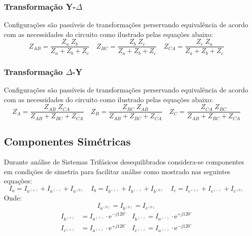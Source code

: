 \documentclass{article}
\begin{document}
\subsubsection{Transformação Y-$\Delta$}
\begin{definition}
    Configurações são passíveis de transformações perservando equivalência de acordo com as necessidades do circuito como ilustrado pelas equações abaixo:
    \begin{equation}
        \boxed{Z_{AB} = \frac{Z_{a}\;Z_{b}}{Z_{a} + Z_{b} + Z_{c}}}
        \quad
        \boxed{Z_{BC} = \frac{Z_{b}\;Z_{c}}{Z_{a} + Z_{b} + Z_{c}}}
        \quad
        \boxed{Z_{CA} = \frac{Z_{c}\;Z_{a}}{Z_{a} + Z_{b} + Z_{c}}}
    \end{equation}
\end{definition}

\subsubsection{Transformação $\Delta$-Y}
\begin{definition}
    Configurações são passíveis de transformações perservando equivalência de acordo com as necessidades do circuito como ilustrado pelas equações abaixo:
    \begin{equation}
        \boxed{Z_{A} = \frac{Z_{AB}\;Z_{CA}}{Z_{AB} + Z_{BC} + Z_{CA}}}
        \quad
        \boxed{Z_{B} = \frac{Z_{BC}\;Z_{AB}}{Z_{AB} + Z_{BC} + Z_{CA}}}
        \quad
        \boxed{Z_{C} = \frac{Z_{CA}\;Z_{BC}}{Z_{AB} + Z_{BC} + Z_{CA}}}
    \end{equation}
\end{definition}

\subsection{Componentes Simétricas}
\begin{definition}
    Durante análise de Sistemas Trifásicos desequilibrados considera-se componentes em condições de simetria para facilitar análise como mostrado nas seguintes equações:
    \begin{equation}
        \boxed{I_{a} = I_{a^{(+)}} + I_{a^{(-)}} + I_{a^{(0)}}}
        \quad
        \boxed{I_{b} = I_{b^{(+)}} + I_{b^{(-)}} + I_{b^{(0)}}}
        \quad
        \boxed{I_{c} = I_{c^{(+)}} + I_{c^{(-)}} + I_{c^{(0)}}}
    \end{equation}
    Onde:
    \begin{equation*}
        I_{a^{(0)}} = I_{b^{(0)}} = I_{c^{(0)}}
    \end{equation*}
    \begin{align}
        I_{b^{(+)}} &= I_{a^{(+)}}\cdot\text{e}^{-j120^{\circ}} & I_{b^{(-)}} = I_{a^{(-)}}\cdot\text{e}^{+j120^{\circ}}\nonumber\\
        I_{c^{(+)}} &= I_{a^{(+)}}\cdot\text{e}^{+j120^{\circ}} & I_{c^{(-)}} = I_{a^{(-)}}\cdot\text{e}^{-j120^{\circ}}\nonumber
    \end{align}
\end{definition}
\end{document}
